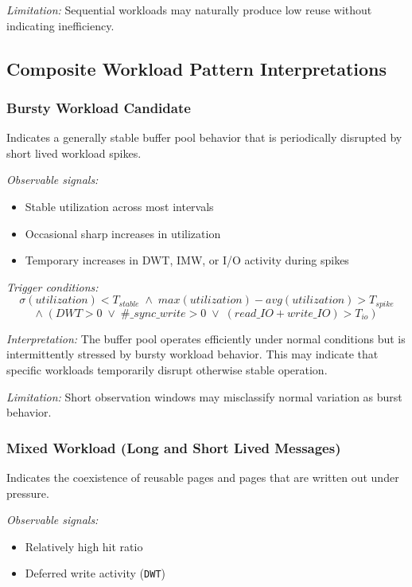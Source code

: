 \textit{Limitation:}  
Sequential workloads may naturally produce low reuse without indicating inefficiency.


\subsection{Composite Workload Pattern Interpretations}

\subsubsection{Bursty Workload Candidate}

Indicates a generally stable buffer pool behavior that is periodically disrupted by short lived workload spikes.

\textit{Observable signals:}
\begin{itemize}
    \item Stable utilization across most intervals
    \item Occasional sharp increases in utilization
    \item Temporary increases in DWT, IMW, or I/O activity during spikes
\end{itemize}

\textit{Trigger conditions:}
\[
\sigma(utilization) < T_{stable} \;\land\; max(utilization) - avg(utilization) > T_{spike}
\]
\[
\land\; (DWT > 0 \;\lor\; \#\_sync\_write > 0 \;\lor\; (read\_IO + write\_IO) > T_{io})
\]

\textit{Interpretation:}  
The buffer pool operates efficiently under normal conditions but is intermittently stressed by bursty workload behavior. This may indicate that specific workloads temporarily disrupt otherwise stable operation.

\textit{Limitation:}  
Short observation windows may misclassify normal variation as burst behavior.


\subsubsection{Mixed Workload (Long and Short Lived Messages)}

Indicates the coexistence of reusable pages and pages that are written out under pressure.

\textit{Observable signals:}
\begin{itemize}
    \item Relatively high hit ratio 
    \item Deferred write activity (\texttt{DWT})
\end{itemize}

